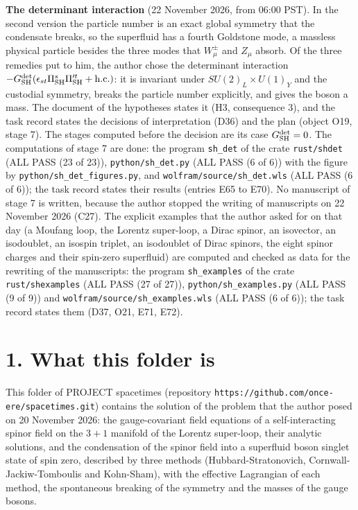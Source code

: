 \documentclass[
  10pt,
]{article}
\begin{document}
\textbf{The determinant interaction} (22 November 2026, from 06:00 PST).
In the second version the particle number is an exact global symmetry
that the condensate breaks, so the superfluid has a fourth Goldstone
mode, a massless physical particle besides the three modes that
\(W^\pm_\mu\) and \(Z_\mu\) absorb. Of the three remedies put to him,
the author chose the determinant interaction
\(-G^{\rm det}_{\rm SH}(\epsilon_{st}\Pi^s_{\rm SH}\Pi'^t_{\rm SH}+{\rm h.c.})\):
it is invariant under \(SU(2)_L\times U(1)_Y\) and the custodial
symmetry, breaks the particle number explicitly, and gives the boson a
mass. The document of the hypotheses states it (H3, consequence 3), and
the task record states the decisions of interpretation (D36) and the
plan (object O19, stage 7). The stages computed before the decision are
its case \(G^{\rm det}_{\rm SH}=0\). The computations of stage 7 are
done: the program \texttt{sh\_det} of the crate \texttt{rust/shdet} (ALL
PASS (23 of 23)), \texttt{python/sh\_det.py} (ALL PASS (6 of 6)) with
the figure by \texttt{python/sh\_det\_figures.py}, and
\texttt{wolfram/source/sh\_det.wls} (ALL PASS (6 of 6)); the task record
states their results (entries E65 to E70). No manuscript of stage 7 is
written, because the author stopped the writing of manuscripts on 22
November 2026 (C27). The explicit examples that the author asked for on
that day (a Moufang loop, the Lorentz super-loop, a Dirac spinor, an
isovector, an isodoublet, an isospin triplet, an isodoublet of Dirac
spinors, the eight spinor charges and their spin-zero superfluid) are
computed and checked as data for the rewriting of the manuscripts: the
program \texttt{sh\_examples} of the crate \texttt{rust/shexamples} (ALL
PASS (27 of 27)), \texttt{python/sh\_examples.py} (ALL PASS (9 of 9))
and \texttt{wolfram/source/sh\_examples.wls} (ALL PASS (6 of 6)); the
task record states them (D37, O21, E71, E72).

\hypertarget{what-this-folder-is}{%
\section{1. What this folder is}\label{what-this-folder-is}}

This folder of PROJECT spacetimes (repository
\texttt{https://github.com/once-ere/spacetimes.git}) contains the
solution of the problem that the author posed on 20 November 2026: the
gauge-covariant field equations of a self-interacting spinor field on
the \(3+1\) manifold of the Lorentz super-loop, their analytic
solutions, and the condensation of the spinor field into a superfluid
boson singlet state of spin zero, described by three methods
(Hubbard-Stratonovich, Cornwall-Jackiw-Tomboulis and Kohn-Sham), with
the effective Lagrangian of each method, the spontaneous breaking of the
symmetry and the masses of the gauge bosons.
\end{document}
